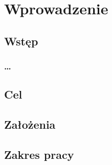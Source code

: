 \chapter{Wprowadzenie}
\label{t:int}

\section{Wstęp}
\label{t:int:stateofart}

	\subsection{\dots}

\section{Cel}

\section{Założenia}

\section{Zakres pracy}
